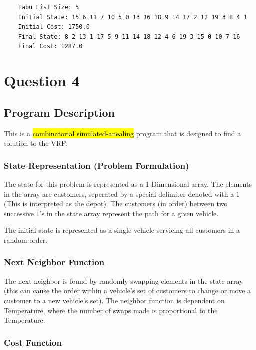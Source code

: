 \documentclass{article}
\begin{document}
\begin{lstlisting}
    Tabu List Size: 5
    Initial State: 15 6 11 7 10 5 0 13 16 18 9 14 17 2 12 19 3 8 4 1
    Initial Cost: 1750.0
    Final State: 8 2 13 1 17 5 9 11 14 18 12 4 6 19 3 15 0 10 7 16
    Final Cost: 1287.0
\end{lstlisting}

\newpage
\section{Question 4}

\subsection{Program Description}

This is a \hl{combinatorial simulated-anealing} program that is designed to find a solution to the VRP.

\subsubsection{State Representation (Problem Formulation)}

The state for this problem is represented as a 1-Dimensional array.
The elements in the array are customers, seperated by a special delimiter denoted with a $1$ (This is interpreted as the depot).
The customers (in order) between two successive $1$'s in the state array represent the path for a given vehicle.

\setlength{\parskip}{6pt}

The initial state is represented as a single vehicle servicing all customers in a random order.

\subsubsection{Next Neighbor Function}

The next neighbor is found by randomly swapping elements in the state array (this can cause the order within a vehicle's set of customers to change or move a customer to a new vehicle's set).
The neighbor function is dependent on Temperature, where the number of swaps made is proportional to the Temperature.

\subsubsection{Cost Function}
\end{document}
